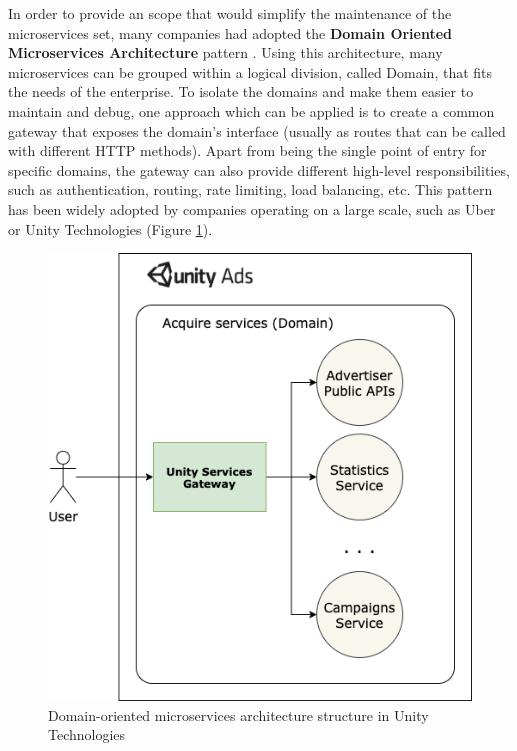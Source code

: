 \documentclass[12pt]{article}
\begin{document}
In order to provide an scope that would simplify the maintenance of the microservices set, many companies had adopted the \textbf{Domain Oriented Microservices Architecture} pattern \cite{DOMAUber}. Using this architecture, many microservices can be grouped within a logical division, called Domain, that fits the needs of the enterprise. To isolate the domains and make them easier to maintain and debug, one approach which can be applied is to create a common gateway that exposes the domain's interface (usually as routes that can be called with different HTTP methods). Apart from being the single point of entry for specific domains, the gateway can also provide different high-level responsibilities, such as authentication, routing, rate limiting, load balancing, etc. This pattern has been widely adopted by companies operating on a large scale, such as Uber \cite{GatewayUber} or Unity Technologies (Figure \ref{fig:unity-acquire-domain}).\\

\begin{figure}[h]
    \centering
    \includegraphics[scale=0.3]{src/proposal/img/unity-services-diagram.png}
    \caption{Domain-oriented microservices architecture structure in Unity Technologies}
    \label{fig:unity-acquire-domain}
\end{figure}
\end{document}
